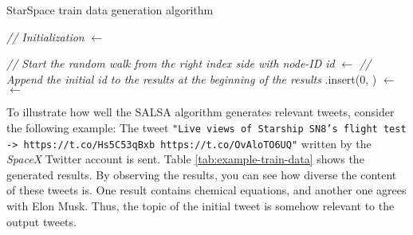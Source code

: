 \begin{algorithm}[!htb]
    \caption{StarSpace train data generation algorithm}
    \label{alg:star-space-train-data}




    \SetAlgoLined

    \BlankLine\emph{// Initialization}\BlankLine
    \allIDs $\leftarrow$ \getAllRightIndexKeys{}\;

    \BlankLine

    {
        \emph{// Start the random walk from the right index side with node-ID id}\;
        \listRecommendations $\leftarrow$ \startRandomWalkFromRightIndex{\id}\;
        \BlankLine
        \emph{// Append the initial id to the results at the beginning of the results}\;
        \listRecommendations.insert(0, \id)\;
        \BlankLine
        \listContent $\leftarrow$ \getContentOf{\listRecommendations}\;
        \document $\leftarrow$ \;
        \;
    }

    \BlankLine
\end{algorithm}


To illustrate how well the SALSA algorithm generates relevant tweets, consider the following example:
The tweet \texttt{"Live views of Starship SN8’s flight test -> https://t.co/Hs5C53qBxb https://t.co/OvAloTO6UQ"} written by the \emph{SpaceX} Twitter account is sent. Table \ref{tab:example-train-data} shows the generated results. By observing the results, you can see how diverse the content of these tweets is. One result contains chemical equations, and another one agrees with Elon Musk. Thus, the topic of the initial tweet is somehow relevant to the output tweets.

